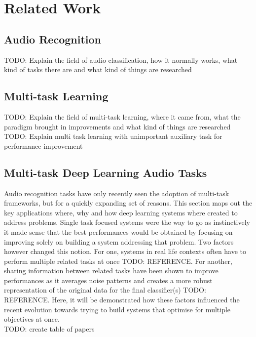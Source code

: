 \chapter{Related Work}

\section{Audio Recognition}
TODO: Explain the field of audio classification, how it normally works, what kind of tasks there are and what kind of things are researched

\section{Multi-task Learning}
TODO: Explain the field of multi-task learning, where it came from, what the paradigm brought in improvements and what kind of things are researched
TODO: Explain multi task learning with unimportant auxiliary task for performance improvement

\section{Multi-task Deep Learning Audio Tasks}

Audio recognition tasks have only recently seen the adoption of multi-task frameworks, but for a quickly expanding set of reasons. This section maps out the key applications where, why and how deep learning systems where created to address problems. Single task focused systems were the way to go as instinctively it made sense that the best performances would be obtained by focusing on improving solely on building a system addressing that problem. Two factors however changed this notion. For one, systems in real life contexts often have to perform multiple related tasks at once TODO: REFERENCE. For another, sharing information between related tasks have been shown to improve performances as it averages noise patterns and creates a more robust representation of the original data for the final classifier(s) TODO: REFERENCE. Here, it will be demonstrated how these factors influenced the recent evolution towards trying to build systems that optimise for multiple objectives at once.\\

TODO: create table of papers


